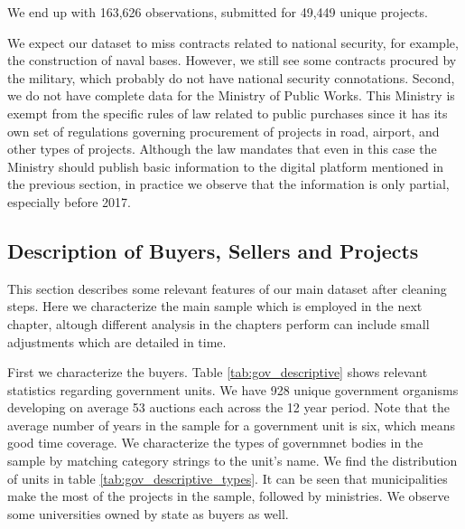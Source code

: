 We end up with 163,626 observations, submitted for 49,449 unique projects.

We expect our dataset to miss contracts related to national security, for example, the construction of naval bases. However, we still see some contracts procured by the military, which probably do not have national security connotations. Second, we do not have complete data for the Ministry of Public Works. This Ministry is exempt from the specific rules of law related to public purchases since it has its own set of regulations governing procurement of projects in road, airport, and other types of projects. Although the law mandates that even in this case the Ministry should publish basic information to the digital platform mentioned in the previous section, in practice we observe that the information is only partial, especially before 2017. %

\subsection{Description of Buyers, Sellers and Projects}
This section describes some relevant features of our main dataset after cleaning steps. Here we characterize the main sample which is employed in the next chapter, altough different analysis in the chapters perform can include small adjustments which are detailed in time.

First we characterize the buyers. Table \ref{tab:gov_descriptive} shows relevant statistics regarding government units. We have 928 unique government organisms developing on average 53 auctions each across the 12 year period. Note that the average number of years in the sample for a government unit is six, which means good time coverage. We characterize the types of governmnet bodies in the sample by matching category strings to the unit's name. We find the distribution of units in table \ref{tab:gov_descriptive_types}. It can be seen that municipalities make the most of the projects in the sample, followed by ministries. We observe some universities owned by state as buyers as well.




